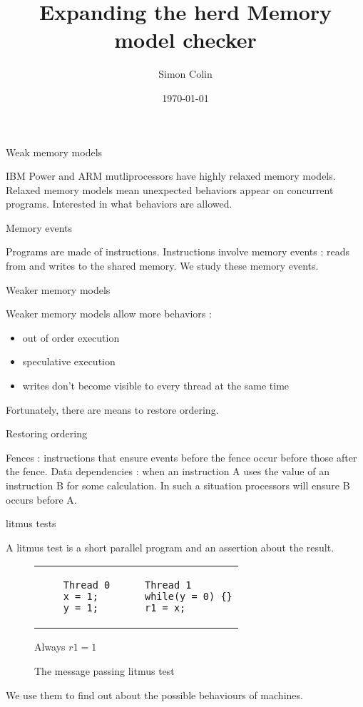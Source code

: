 \documentclass[dvipsnames,svgnames,beamer]{beamer}
\title{Expanding the herd Memory model checker}
\author{Simon Colin}
\date{\today}
\begin{document}
\begin{frame}
	\titlepage
\end{frame}

\begin{frame}{Weak memory models}

	IBM Power and ARM mutliprocessors have highly relaxed memory models.
	\vfill
	Relaxed memory models mean unexpected behaviors appear on concurrent programs.
	\vfill
	Interested in what behaviors are allowed.
	
\end{frame}

\begin{frame}{Memory events}

	Programs are made of instructions.
	\vfill %
	Instructions involve memory events : reads from and writes to the shared memory.
	\vfill
	We study these memory events.

\end{frame}

\begin{frame}{Weaker memory models}

	\vfill
	\vfill
	Weaker memory models allow more behaviors :\begin{itemize}
	\item out of order execution
	\item speculative execution
	\item writes don't become visible to every thread at the same time
	\end{itemize}
	\vfill
	Fortunately, there are means to restore ordering.
	\vfill

\end{frame}

\begin{frame}{Restoring ordering}

	Fences : instructions that ensure events before the fence occur before those after the fence.
	\vfill
	Data dependencies : when an instruction A uses the value of an instruction B for some calculation.
	\vfill
	In such a situation processors will ensure B occurs before A.

\end{frame}

\begin{frame}[fragile]{litmus tests}

	\vfill
	\vfill
	A litmus test is a short parallel program and an assertion about the result.
	\begin{figure}
	\centering
	\begin{tabular}{p{4cm} p{4cm}}
	\begin{verbatim}
	Thread 0
	x = 1;
	y = 1;
	\end{verbatim} &
	\begin{verbatim}
	Thread 1
	while(y = 0) {}
	r1 = x;
	\end{verbatim}
	\end{tabular}
	\centerline{Always $r1 = 1$}
	\caption{The message passing litmus test}
	\end{figure}
	\vfill
	We use them to find out about the possible behaviours of machines.
	\vfill
	\vfill

\end{frame}
\end{document}
